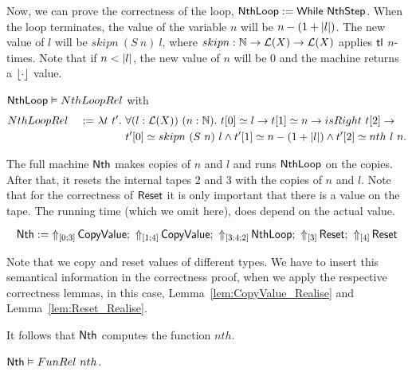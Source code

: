Now, we can prove the correctness of the loop, $\MS{NthLoop} := \While~\MS{NthStep}$.  When the loop terminates, the value of the variable $n$ will be
$n - (1 + \length{l})$.  The new value of $l$ will be $skipn~(S~n)~l$, where $skipn : \Nat \to \List(X) \to \List(X)$ applies $\tl$ $n$-times.  Note
that if $n < \length{l}$, the new value of $n$ will be $0$ and the machine returns a $\Some\cdot$ value.

\begin{lemma}
  \label{lem:Nth_Loop_Realise}
  $\MS{NthLoop} \Realise NthLoopRel$ with
  \begin{alignat*}{2}
    & NthLoopRel &~:=~& \lambda t~t'.~\forall (l:\List(X))~(n:\Nat).~t[0] \simeq l \rightarrow t[1] \simeq n \rightarrow isRight~t[2] \rightarrow \\
    &            &~  ~& \phantom{\lambda t~t'.}~t'[0] \simeq skipn~(S~n)~l \land t'[1] \simeq n-(1+\length{l}) \land t'[2] \simeq nth~l~n.
  \end{alignat*}
\end{lemma}

The full machine $\MS{Nth}$ makes copies of $n$ and $l$ and runs $\MS{NthLoop}$ on the copies.  After that, it resets the internal tapes $2$ and $3$
with the copies of $n$ and $l$.  Note that for the correctness of $\MS{Reset}$ it is only important that there is a value on the tape.  The running time
(which we omit here), does depend on the actual value.
\begin{definition}[$\MS{Nth}$][Nth]
  \[
    \MS{Nth} := \LiftTapes{\MS{CopyValue}}{\Vector{0;3}} \Seq
    \LiftTapes{\MS{CopyValue}}{\Vector{1;4}} \Seq
    \LiftTapes{\MS{NthLoop}}{\Vector{3;4;2}} \Seq
    \LiftTapes{\MS{Reset}}{\Vector{3}} \Seq
    \LiftTapes{\MS{Reset}}{\Vector{4}}
  \]
\end{definition}
Note that we copy and reset values of different types.  We have to insert this semantical information in the correctness proof, when we apply the
respective correctness lemmas, in this case, Lemma~\ref{lem:CopyValue_Realise} and Lemma~\ref{lem:Reset_Realise}.

It follows that $\MS{Nth}$ computes the function $nth$.
\begin{lemma}
  \label{lem:Nth_Computes}
  $\MS{Nth} \Realise FunRel~nth$.
\end{lemma}



